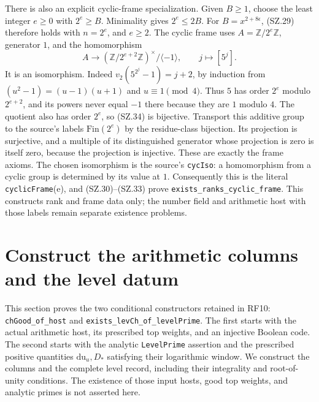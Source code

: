\documentclass[11pt,a4paper]{article}
\numberwithin{equation}{section}
\theoremstyle{remark}\newtheorem{remark}[theorem]{Remark}
\begin{document}
There is also an explicit cyclic-frame specialization. Given $B\geq1$,
choose the least integer $e\geq0$ with $2^e\geq B$. Minimality
gives $2^e\leq2B$. For $B=x^{2+8\epsilon}$, (SZ.29) therefore
holds with $n=2^e$, and $e\geq2$. The cyclic frame uses
$A=\mathbb Z/2^e\mathbb Z$, generator $1$, and the homomorphism
\[
 A\longrightarrow
  (\mathbb Z/2^{e+2}\mathbb Z)^\times/\langle-1\rangle,
                            \qquad j\longmapsto[5^j].       \tag{SZ.34}
\]
It is an isomorphism. Indeed
$v_2(5^{2^j}-1)=j+2$, by induction from
$(u^2-1)=(u-1)(u+1)$ and $u\equiv1\pmod4$.
Thus $5$ has order $2^e$ modulo $2^{e+2}$, and its powers never
equal $-1$ there because they are $1$ modulo $4$. The quotient
also has order $2^e$, so (SZ.34) is bijective.
Transport this additive group to the source's labels
$\mathrm{Fin}(2^e)$ by the residue-class bijection. Its projection
is surjective, and a multiple of its distinguished generator whose
projection is zero is itself zero, because the projection is
injective. These are exactly the frame axioms.
The chosen isomorphism is the source's \texttt{cycIso}: a homomorphism
from a cyclic group is determined by its value at $1$.
Consequently this is the literal \texttt{cyclicFrame}(e), and
(SZ.30)--(SZ.33) prove \texttt{exists\_\allowbreak ranks\_\allowbreak cyclic\_\allowbreak frame}.
This constructs rank and frame data only; the number field and
arithmetic host with those labels remain separate existence problems.


\section{Construct the arithmetic columns and the level datum}
\label{sec:arithmetic-constructors}

This section proves the two conditional constructors retained in RF10:
\texttt{chGood\_\allowbreak of\_\allowbreak host} and \texttt{exists\_\allowbreak levCh\_\allowbreak of\_\allowbreak levelPrime}.
The first starts with the actual arithmetic host, its prescribed top weights,
and an injective Boolean code. The second starts with the analytic
\texttt{LevelPrime} assertion and the prescribed positive quantities
$\mathrm{du}_u,D_*$ satisfying their logarithmic window. We construct the
columns and the complete level record, including their integrality and
root-of-unity conditions. The existence of those input hosts, good top
weights, and analytic primes is not asserted here.
\end{document}

